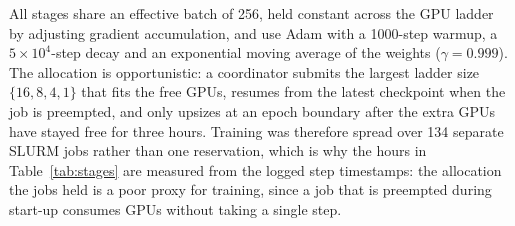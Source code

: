 \documentclass[11pt]{article}
\begin{document}
All stages share an effective batch of 256, held constant across the GPU ladder
by adjusting gradient accumulation, and use Adam with a 1000-step warmup, a
$5\times10^{4}$-step decay and an exponential moving average of the weights
($\gamma = 0.999$). The allocation is opportunistic: a coordinator submits the
largest ladder size $\{16, 8, 4, 1\}$ that fits the free GPUs, resumes from the
latest checkpoint when the job is preempted, and only upsizes at an epoch
boundary after the extra GPUs have stayed free for three hours. Training was
therefore spread over 134 separate SLURM jobs rather than one reservation,
which is why the hours in Table~\ref{tab:stages} are measured from the logged
step timestamps: the allocation the jobs held is a poor proxy for training,
since a job that is preempted during start-up consumes GPUs without taking a
single step.
\end{document}
